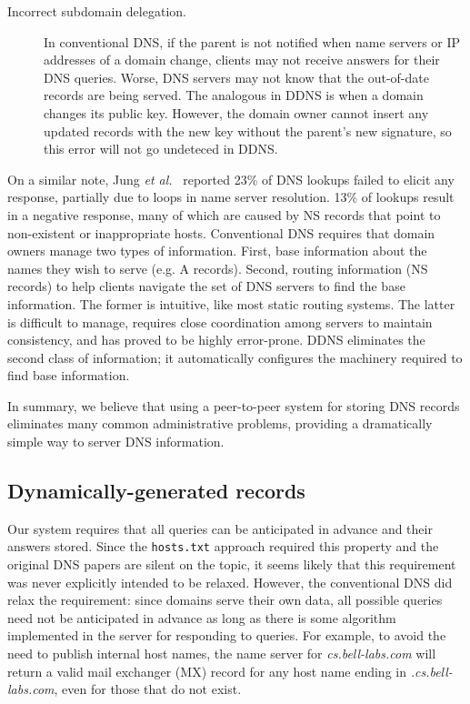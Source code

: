 \begin{description}
\item[Incorrect subdomain delegation.]
In conventional DNS, if the parent is not notified 
when name servers or IP addresses of a domain change, 
clients may not receive answers for their DNS queries.
Worse, DNS servers may not know that the out-of-date 
records are being served. The analogous in DDNS is when
a domain changes its public key. However, the domain 
owner cannot insert any updated records with the new key
without the parent's new signature, so this error will
not go undeteced in DDNS.
\end{description}

On a similar note, Jung {\it et al.}~\cite{dnscache:sigcommimw01} 
reported 23\% of 
DNS lookups failed to elicit any response, partially due to loops 
in name server resolution. 13\% of lookups result in a negative 
response, many of which are caused by NS records that point to 
non-existent or inappropriate hosts.
Conventional DNS requires that domain owners manage two types of
information. First, base information about the names they wish to
serve (e.g. A records). Second, routing information (NS records) to
help clients navigate the set of DNS servers to find the base
information.  The former is intuitive, like most static routing
systems. The latter is difficult to manage, requires close
coordination among servers to maintain consistency, and has proved to
be highly error-prone. DDNS eliminates the second class of
information; it automatically configures the machinery required to
find base information.


In summary, we believe that using a peer-to-peer system for
storing DNS records eliminates many common administrative
problems, providing a dramatically simple way to server DNS 
information.

\subsection{Dynamically-generated records}

Our system requires that all queries
can be anticipated in advance and their answers stored.
Since the {\tt hosts.txt} approach required this property
and the original DNS papers are silent on the topic,
it seems likely that this requirement was never 
explicitly intended to be relaxed.
However, the conventional DNS did relax the requirement:
since domains serve their own data, all possible queries need 
not be anticipated in advance as long as there is some algorithm
implemented in the server for responding to queries.
For example, to avoid the need to publish internal host names,
the name server for
{\em cs.bell-labs.com} will return a valid mail exchanger (MX) record
for any host name ending in {\em .cs.bell-labs.com}, even
for those that do not exist.

